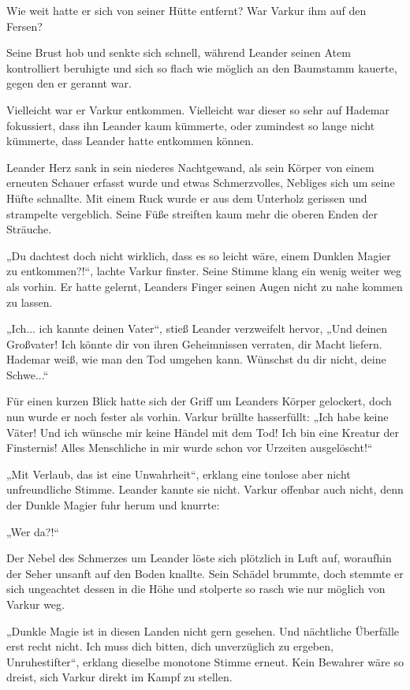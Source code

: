 Wie weit hatte er sich von seiner Hütte entfernt? War Varkur ihm auf den Fersen?

Seine Brust hob und senkte sich schnell, während Leander seinen Atem kontrolliert beruhigte und sich so flach wie möglich an den Baumstamm kauerte, gegen den er gerannt war.

Vielleicht war er Varkur entkommen. Vielleicht war dieser so sehr auf Hademar fokussiert, dass ihn Leander kaum kümmerte, oder zumindest so lange nicht kümmerte, dass Leander hatte entkommen können.

Leander Herz sank in sein niederes Nachtgewand, als sein Körper von einem erneuten Schauer erfasst wurde und etwas Schmerzvolles, Nebliges sich um seine Hüfte schnallte. Mit einem Ruck wurde er aus dem Unterholz gerissen und strampelte vergeblich. Seine Füße streiften kaum mehr die oberen Enden der Sträuche.

„Du dachtest doch nicht wirklich, dass es so leicht wäre, einem Dunklen Magier zu entkommen?!“, lachte Varkur finster. Seine Stimme klang ein wenig weiter weg als vorhin. Er hatte gelernt, Leanders Finger seinen Augen nicht zu nahe kommen zu lassen.

„Ich... ich kannte deinen Vater“, stieß Leander verzweifelt hervor, „Und deinen Großvater! Ich könnte dir von ihren Geheimnissen verraten, dir Macht liefern. Hademar weiß, wie man den Tod umgehen kann. Wünschst du dir nicht, deine Schwe...“

Für einen kurzen Blick hatte sich der Griff um Leanders Körper gelockert, doch nun wurde er noch fester als vorhin. Varkur brüllte hasserfüllt: „Ich habe keine Väter! Und ich wünsche mir keine Händel mit dem Tod! Ich bin eine Kreatur der Finsternis! Alles Menschliche in mir wurde schon vor Urzeiten ausgelöscht!“

„Mit Verlaub, das ist eine Unwahrheit“, erklang eine tonlose aber nicht unfreundliche Stimme. Leander kannte sie nicht. Varkur offenbar auch nicht, denn der Dunkle Magier fuhr herum und knurrte:

„Wer da?!“

Der Nebel des Schmerzes um Leander löste sich plötzlich in Luft auf, woraufhin der Seher unsanft auf den Boden knallte. Sein Schädel brummte, doch stemmte er sich ungeachtet dessen in die Höhe und stolperte so rasch wie nur möglich von Varkur weg.

„Dunkle Magie ist in diesen Landen nicht gern gesehen. Und nächtliche Überfälle erst recht nicht. Ich muss dich bitten, dich unverzüglich zu ergeben, Unruhestifter“, erklang dieselbe monotone Stimme erneut. Kein Bewahrer wäre so dreist, sich Varkur direkt im Kampf zu stellen.

